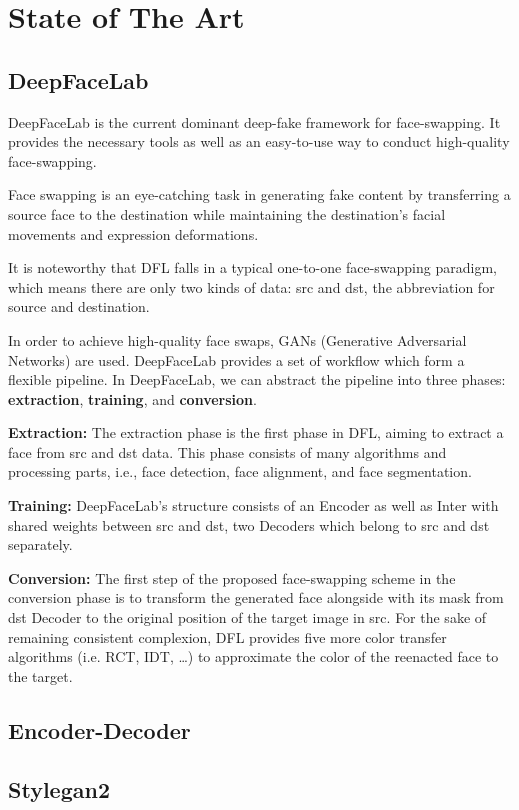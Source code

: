 \chapter[State of The Art]{State of The Art}
\section{DeepFaceLab}
\cite{dfl} DeepFaceLab is the current dominant deep-fake
framework for face-swapping. It provides the necessary tools 
as well as an easy-to-use way to conduct high-quality face-swapping. 


Face swapping is an eye-catching task in generating
fake content by transferring a source face to the destination
while maintaining the destination’s facial movements and
expression deformations.


It is noteworthy that DFL falls in a typical one-to-one 
face-swapping paradigm, which means there
are only two kinds of data: src and dst, the abbreviation for
source and destination.


In order to achieve high-quality face swaps, GANs (Generative
Adversarial Networks) are used.
DeepFaceLab provides a set of workflow which form a
flexible pipeline. In DeepFaceLab, we can
abstract the pipeline into three phases: \textbf{extraction},
\textbf{training}, and \textbf{conversion}.

\textbf{Extraction:} The extraction phase is the first phase in DFL, aiming to
extract a face from src and dst data. This phase consists
of many algorithms and processing parts, i.e., face detection, face alignment, and face segmentation.

\textbf{Training:} DeepFaceLab's structure consists of an
Encoder as well as Inter with shared weights between src
and dst, two Decoders which belong to src and dst separately. 

\textbf{Conversion:} 
The first step of the proposed face-swapping scheme in 
the conversion phase is to transform the
generated face alongside with its mask from dst Decoder
to the original position of the target image in src.
For the sake of remaining consistent complexion, 
DFL provides five more color
transfer algorithms (i.e. RCT, IDT, \dots) to approximate the 
color of the reenacted face to the target.
\newpage
\section{Encoder-Decoder}
\section{Stylegan2}
